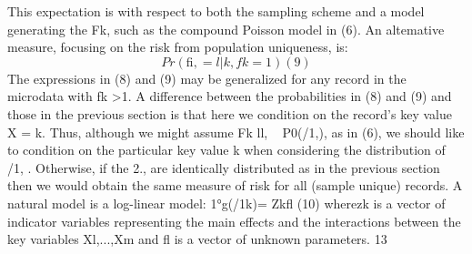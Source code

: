 This expectation is with respect to both the sampling scheme and a model generating
the Fk, such as the compound Poisson model in (6). An altemative measure, focusing on
the risk from population uniqueness, is:
\[ Pr(ﬁ, =l|k,fk =1) (9)\]
The expressions in (8) and (9) may be generalized for any record in the microdata with
fk >1. A difference between the probabilities in (8) and (9) and those in the previous
section is that here we condition on the record’s key value X = k. Thus, although we
might assume Fk ll, ~ P0(/1,), as in (6), we should like to condition on the particular
key value k when considering the distribution of /1, . Otherwise, if the 2., are identically
distributed as in the previous section then we would obtain the same measure of risk for
all (sample unique) records. A natural model is a log-linear model:
1°g(/1k)= Zkﬂ (10)
wherezk is a vector of indicator variables representing the main effects and the
interactions between the key variables Xl,...,Xm and ﬂ is a vector of unknown
parameters.
13

